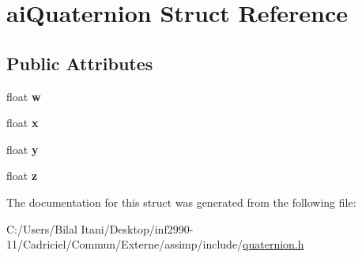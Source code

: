 \hypertarget{structai_quaternion}{}\section{ai\+Quaternion Struct Reference}
\label{structai_quaternion}
\subsection*{Public Attributes}
\begin{DoxyCompactItemize}
\item 
float {\bfseries w}\hypertarget{structai_quaternion_a410b3c46417d67d728a01a5810907a36}{}\label{structai_quaternion_a410b3c46417d67d728a01a5810907a36}

\item 
float {\bfseries x}\hypertarget{structai_quaternion_af9db21b086c14d8654d62005f740e75f}{}\label{structai_quaternion_af9db21b086c14d8654d62005f740e75f}

\item 
float {\bfseries y}\hypertarget{structai_quaternion_a1695fefbc60becf95fcafcc08573ab44}{}\label{structai_quaternion_a1695fefbc60becf95fcafcc08573ab44}

\item 
float {\bfseries z}\hypertarget{structai_quaternion_acc30da6103d5131fb1bed6640f1eeda0}{}\label{structai_quaternion_acc30da6103d5131fb1bed6640f1eeda0}

\end{DoxyCompactItemize}


The documentation for this struct was generated from the following file\+:\begin{DoxyCompactItemize}
\item 
C\+:/\+Users/\+Bilal Itani/\+Desktop/inf2990-\/11/\+Cadriciel/\+Commun/\+Externe/assimp/include/\hyperlink{quaternion_8h}{quaternion.\+h}\end{DoxyCompactItemize}
